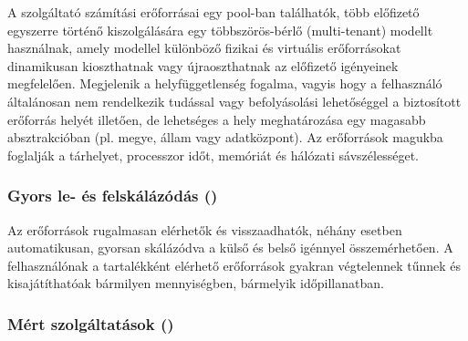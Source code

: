 A szolgáltató számítási erőforrásai egy pool-ban  találhatók, több előfizető egyszerre történő kiszolgálására egy többszörös-bérlő (multi-tenant) modellt használnak, amely modellel különböző fizikai és virtuális erőforrásokat dinamikusan kioszthatnak vagy újraoszthatnak az előfizető igényeinek megfelelően. Megjelenik a helyfüggetlenség fogalma, vagyis hogy a felhasználó általánosan nem rendelkezik tudással vagy befolyásolási lehetőséggel a biztosított erőforrás helyét illetően, de lehetséges a hely meghatározása egy magasabb absztrakcióban (pl. megye, állam vagy adatközpont). Az erőforrások magukba foglalják a tárhelyet, processzor időt, memóriát és hálózati sávszélességet.

\subsubsection{Gyors le- és felskálázódás ()}

Az erőforrások rugalmasan elérhetők és visszaadhatók, néhány esetben automatikusan, gyorsan skálázódva a külső és belső igénnyel összemérhetően. A felhasználónak a tartalékként elérhető erőforrások gyakran végtelennek tűnnek és kisajátíthatóak bármilyen mennyiségben, bármelyik időpillanatban.

\subsubsection{Mért szolgáltatások ()}

